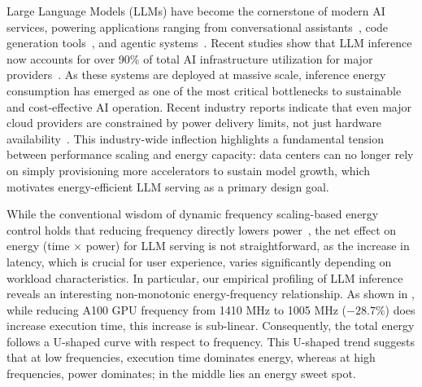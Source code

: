 Large Language Models (LLMs) have become the cornerstone of modern AI services, powering applications ranging from conversational assistants~\cite{chatgpt,gemini}, code generation tools~\cite{copilot,cursor}, and agentic systems~\cite{zhang2025webpilot,wu2024autogen}.
Recent studies show that LLM inference now accounts for over 90\% of total AI infrastructure utilization for major providers~\cite{desislavov2023trends}.
As these systems are deployed at massive scale, inference energy consumption has emerged as one of the most critical bottlenecks to sustainable and cost-effective AI operation.
Recent industry reports indicate that even major cloud providers are constrained by power delivery limits, not just hardware availability~\cite{elsworth2025measuring,patel2024characterizing}.
This industry-wide inflection highlights a fundamental tension between performance scaling and energy capacity: data centers can no longer rely on simply provisioning more accelerators to sustain model growth, which motivates energy-efficient LLM serving as a primary design goal.



While the conventional wisdom of dynamic frequency scaling-based energy control holds that reducing frequency directly lowers power~\cite{gonzalez1997supply}, the net effect on energy (time $\times$ power) for LLM serving is not straightforward, as the increase in latency, which is crucial for user experience, varies significantly depending on workload characteristics.
In particular, our empirical profiling of LLM inference
reveals an interesting non-monotonic energy-frequency relationship.
As shown in , while reducing A100 GPU frequency from 1410 MHz to 1005 MHz ($-28.7\%$) does increase execution time, this increase is sub-linear.
Consequently, the total energy follows a U-shaped curve with respect to frequency.
This U-shaped trend suggests that at low frequencies, execution time dominates energy, whereas at high frequencies, power dominates; in the middle lies an energy sweet spot.

